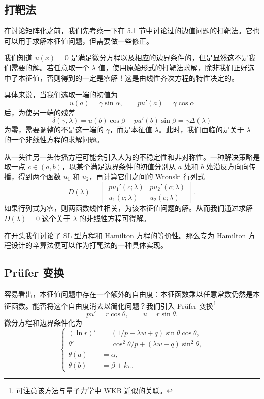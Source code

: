 \subsection{打靶法}

在讨论矩阵化之前，我们先考察一下在 5.1 节中讨论过的边值问题的打靶法。它也可以用于求解本征值问题，但需要做一些修正。

我们知道 $u(x)=0$ 是满足微分方程以及相应的边界条件的，但是显然这不是我们需要的解。若任意取一个 $\lambda$ 值，使用原始形式的打靶法求解，除非我们正好选中了本征值，否则得到的一定是零解！这是由线性齐次方程的特性决定的。

具体来说，当我们选取一端的初值为
\[
u(a)=\gamma\sin\alpha,\qquad pu'(a)=\gamma\cos\alpha
\]
后，为使另一端的残差
\[
\delta(\gamma,\lambda)=u(b)\cos\beta-pu'(b)\sin\beta=\gamma\Delta(\lambda)
\]
为零，需要调整的不是这一端的 $\gamma$，而是本征值 $\lambda$。此时，我们面临的是关于 $\lambda$ 的一个非线性方程的求解问题。

从一头往另一头传播方程可能会引入人为的不稳定性和非对称性。一种解决策略是取一点 $c\in(a,b)$，以某个满足边界条件的初值分别从 $a$ 处和 $b$ 处沿反方向向传播，得到两个函数 $u_1$ 和 $u_2$，再计算它们之间的 Wronski 行列式
\begin{equation}
D(\lambda)=
\begin{vmatrix}
pu_1'(c;\lambda)&pu_2'(c;\lambda)\\
u_1(c;\lambda)&u_2(c;\lambda)
\end{vmatrix}.
\tag{5.3.20}
\end{equation}
如果行列式为零，则两函数线性相关，为该本征值问题的解。从而我们通过求解 $D(\lambda)=0$ 这个关于 $\lambda$ 的非线性方程可得解。

在开头我们讨论了 SL 型方程和 Hamilton 方程的等价性。那么专为 Hamilton 方程设计的辛算法便可以作为打靶法的一种具体实现。

\subsection{Prüfer 变换}

容易看出，本征值问题中存在一个额外的自由度：本征函数乘以任意常数仍然是本征函数。能否将这个自由度消去以简化问题？我们引入 Prüfer 变换\footnote{可注意该方法与量子力学中 WKB 近似的关联。}
\begin{equation}
pu'=r\cos\theta,\qquad u=r\sin\theta.
\tag{5.3.21}
\end{equation}
微分方程和边界条件化为
\begin{equation}
\left\{
\begin{aligned}
(\ln r)'&=(1/p-\lambda w+q)\sin\theta\cos\theta,\\
\theta'&=\cos^2\theta/p+(\lambda w-q)\sin^2\theta,\\
\theta(a)&=\alpha,\\
\theta(b)&=\beta+k\pi.
\end{aligned}\right.
\tag{5.3.22}
\end{equation}

